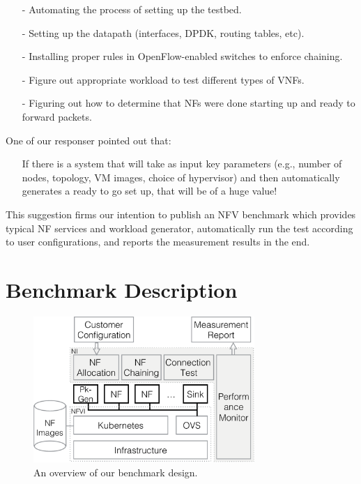 \documentclass{sig-alternate-10pt}
\begin{document}
\begin{itemize}
\item[-]{}
Automating the process of setting up the testbed. 
\item[-]{}
Setting up the datapath (interfaces, DPDK, routing tables, etc).
\item[-]{}
Installing proper rules in OpenFlow-enabled switches to enforce chaining.
\item[-]{}
Figure out appropriate workload to test different types of VNFs.
\item[-]{}
Figuring out how to determine that NFs were done starting up and ready to forward packets. 
\end{itemize}

%
%
%
%

One of our responser pointed out that:
\begin{itemize}
\item[]{}
If there is a system that will take as input key parameters (e.g., number of nodes, topology, VM images, choice of hypervisor) and then automatically generates a ready to go set up, that will be of a huge value!
\end{itemize}
This suggestion firms our intention to publish an NFV benchmark 
which provides typical NF services and workload generator, 
automatically run the test according to user configurations, 
and  reports the measurement results in the end.


\section{ Benchmark Description}

\begin{figure}[t]
\label{design}
\centering
\includegraphics[width=3.3in]{design2.pdf}
\caption{An overview of our benchmark design.}
\end{figure}
\end{document}
